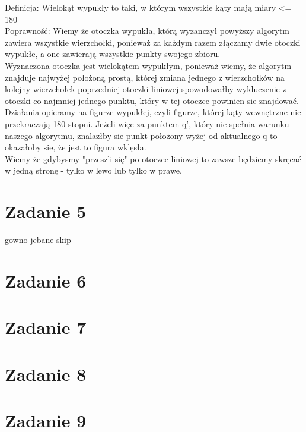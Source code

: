 \documentclass[12pt]{article}
\begin{document}
Definicja: Wielokąt wypukły to taki, w którym wszystkie kąty mają miary <= 180\\

Poprawność:
Wiemy że otoczka wypukła, którą wyzanczył powyższy algorytm zawiera wszystkie wierzchołki, ponieważ za każdym razem złączamy dwie otoczki wypukłe, a one zawierają wszystkie punkty swojego zbioru.\\

Wyznaczona otoczka jest wielokątem wypukłym, ponieważ wiemy, że algorytm znajduje najwyżej położoną prostą, której zmiana jednego z wierzchołków na kolejny wierzchołek poprzedniej otoczki liniowej spowodowałby wykluczenie z otoczki co najmniej jednego punktu, który w tej otoczce powinien sie znajdować.\\

Działania opieramy na figurze wypukłej, czyli figurze, której kąty wewnętrzne nie przekraczają 180 stopni. Jeżeli więc za punktem q', który nie spełnia warunku naszego algorytmu, znalazłby sie punkt położony wyżej od aktualnego q to okazałoby sie, że jest to figura wklęsła.\\

Wiemy że gdybysmy "przeszli się" po otoczce liniowej to zawsze będziemy skręcać w jedną stronę - tylko w lewo lub tylko w prawe.

    

\section{Zadanie 5}
gowno jebane skip
\section{Zadanie 6}


\section{Zadanie 7}

\section{Zadanie 8}

\section{Zadanie 9}



\egroup
\end{document}
